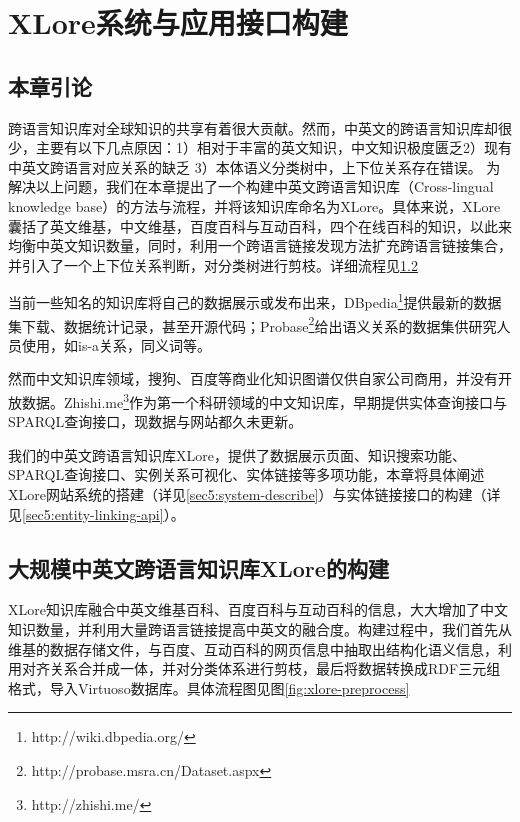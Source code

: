 \chapter{XLore系统与应用接口构建}
\label{cha:xlore}

\section{本章引论}

跨语言知识库对全球知识的共享有着很大贡献。然而，中英文的跨语言知识库却很少，主要有以下几点原因：1）相对于丰富的英文知识，中文知识极度匮乏2）现有中英文跨语言对应关系的缺乏 3）本体语义分类树中，上下位关系存在错误。 为解决以上问题，我们在本章提出了一个构建中英文跨语言知识库（Cross-lingual knowledge base）的方法与流程，并将该知识库命名为{\heiti XLore}。具体来说，XLore囊括了英文维基，中文维基，百度百科与互动百科，四个在线百科的知识，以此来均衡中英文知识数量，同时，利用一个跨语言链接发现方法扩充跨语言链接集合，并引入了一个上下位关系判断，对分类树进行剪枝。详细流程见\ref{sec5:cross-lingual-knowledge-base}

当前一些知名的知识库将自己的数据展示或发布出来，DBpedia\footnote{http://wiki.dbpedia.org/}提供最新的数据集下载、数据统计记录，甚至开源代码；Probase\footnote{http://probase.msra.cn/Dataset.aspx}给出语义关系的数据集供研究人员使用，如is-a关系，同义词等。

然而中文知识库领域，搜狗、百度等商业化知识图谱仅供自家公司商用，并没有开放数据。Zhishi.me\footnote{http://zhishi.me/}作为第一个科研领域的中文知识库，早期提供实体查询接口与SPARQL查询接口，现数据与网站都久未更新。

我们的中英文跨语言知识库XLore，提供了数据展示页面、知识搜索功能、SPARQL查询接口、实例关系可视化、实体链接等多项功能，本章将具体阐述XLore网站系统的搭建（详见\ref{sec5:system-describe}）与实体链接接口的构建（详见\ref{sec5:entity-linking-api}）。

\section{大规模中英文跨语言知识库XLore的构建}
\label{sec5:cross-lingual-knowledge-base}

XLore知识库融合中英文维基百科、百度百科与互动百科的信息，大大增加了中文知识数量，并利用大量跨语言链接提高中英文的融合度。构建过程中，我们首先从维基的数据存储文件，与百度、互动百科的网页信息中抽取出结构化语义信息，利用对齐关系合并成一体，并对分类体系进行剪枝，最后将数据转换成RDF三元组格式，导入Virtuoso数据库。具体流程图见图\ref{fig:xlore-preprocess}

